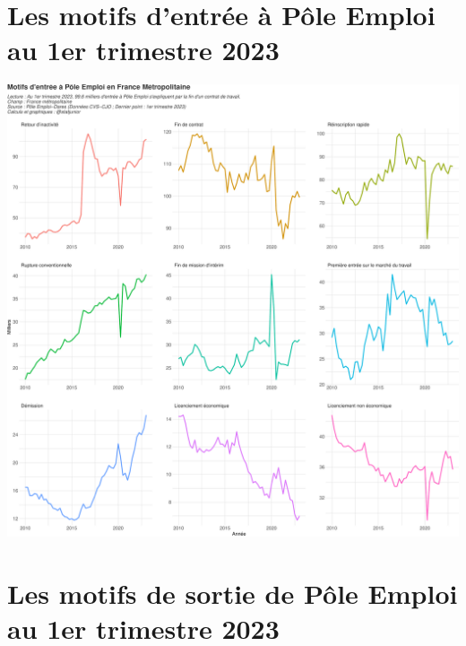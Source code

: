 \documentclass[
  paper=a4,
  ,captions=tableheading
]{scrartcl}
\begin{document}
\hypertarget{les-motifs-dentruxe9e-uxe0-puxf4le-emploi-au-1er-trimestre-2023}{%
\section{Les motifs d'entrée à Pôle Emploi au 1er trimestre
2023}\label{les-motifs-dentruxe9e-uxe0-puxf4le-emploi-au-1er-trimestre-2023}}

\includegraphics{rapport_pdf_demandeurs_emploi_pole_emploi_files/figure-latex/unnamed-chunk-15-1.pdf}

\hypertarget{les-motifs-de-sortie-de-puxf4le-emploi-au-1er-trimestre-2023}{%
\section{Les motifs de sortie de Pôle Emploi au 1er trimestre
2023}\label{les-motifs-de-sortie-de-puxf4le-emploi-au-1er-trimestre-2023}}
\end{document}
